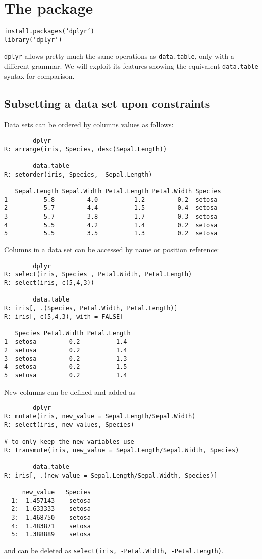 \chapter{The  package}\label{sec: dplyr}
\texttt{install.packages(`dplyr')}\\
\texttt{library(`dplyr')}
\bigskip 

\texttt{dplyr} allows pretty much the same operations as
\texttt{data.table}, only with a different grammar. We
will exploit its features showing the equivalent
\texttt{data.table} syntax for comparison.

\section{Subsetting a data set upon constraints}
Data sets can be ordered by columns values as
follows:
\begin{verbatim}
		dplyr
R: arrange(iris, Species, desc(Sepal.Length))
 
 		data.table
R: setorder(iris, Species, -Sepal.Length)
 
   Sepal.Length Sepal.Width Petal.Length Petal.Width Species
1          5.8         4.0          1.2         0.2  setosa
2          5.7         4.4          1.5         0.4  setosa
3          5.7         3.8          1.7         0.3  setosa
4          5.5         4.2          1.4         0.2  setosa
5          5.5         3.5          1.3         0.2  setosa
\end{verbatim}

Columns in a data set can be accessed by name
or position reference:
\begin{verbatim}
		dplyr
R: select(iris, Species , Petal.Width, Petal.Length)
R: select(iris, c(5,4,3))
 
		data.table
R: iris[, .(Species, Petal.Width, Petal.Length)]
R: iris[, c(5,4,3), with = FALSE]

   Species Petal.Width Petal.Length
1  setosa         0.2          1.4
2  setosa         0.2          1.4
3  setosa         0.2          1.3
4  setosa         0.2          1.5
5  setosa         0.2          1.4
\end{verbatim}
New columns can be defined and added as
\begin{verbatim}
		dplyr
R: mutate(iris, new_value = Sepal.Length/Sepal.Width)
R: select(iris, new_values, Species)

# to only keep the new variables use
R: transmute(iris, new_value = Sepal.Length/Sepal.Width, Species)

		data.table
R: iris[, .(new_value = Sepal.Length/Sepal.Width, Species)]

     new_value   Species
  1:  1.457143    setosa
  2:  1.633333    setosa
  3:  1.468750    setosa
  4:  1.483871    setosa
  5:  1.388889    setosa
\end{verbatim}
and can be deleted as 
\texttt{select(iris, -Petal.Width, -Petal.Length)}.
\bigskip

